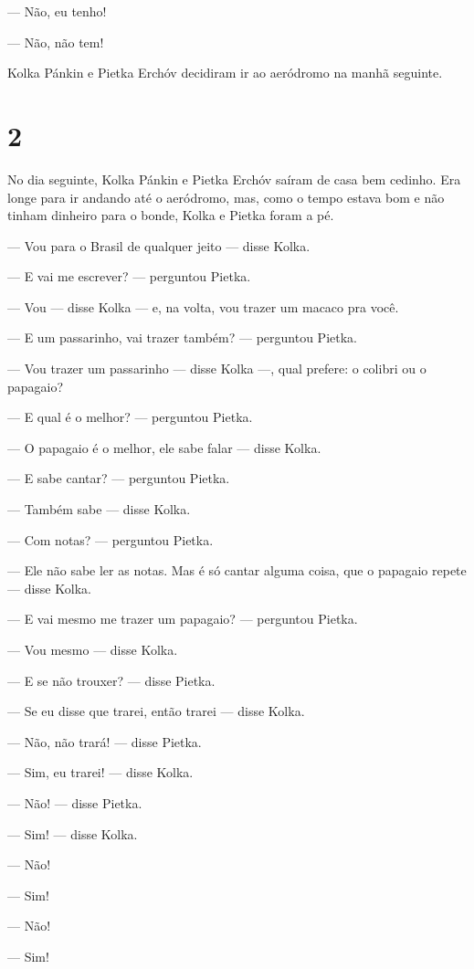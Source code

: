 --- Não, eu tenho!

--- Não, não tem!

Kolka Pánkin e Pietka Erchóv decidiram ir ao aeródromo na manhã
seguinte.

\section{2}

No dia seguinte, Kolka Pánkin e Pietka Erchóv saíram de casa bem
cedinho. Era longe para ir andando até o aeródromo, mas, como o tempo
estava bom e não tinham dinheiro para o bonde, Kolka e Pietka foram a
pé.

--- Vou para o Brasil de qualquer jeito --- disse Kolka.

--- E vai me escrever? --- perguntou Pietka.

--- Vou --- disse Kolka --- e, na volta, vou trazer um macaco pra você.

--- E um passarinho, vai trazer também? --- perguntou Pietka.

--- Vou trazer um passarinho --- disse Kolka ---, qual prefere: o
colibri ou o papagaio?

--- E qual é o melhor? --- perguntou Pietka.

--- O papagaio é o melhor, ele sabe falar --- disse Kolka.

--- E sabe cantar? --- perguntou Pietka.

--- Também sabe --- disse Kolka.

--- Com notas? --- perguntou Pietka.

--- Ele não sabe ler as notas. Mas é só cantar alguma coisa, que o
papagaio repete --- disse Kolka.

--- E vai mesmo me trazer um papagaio? --- perguntou Pietka.

--- Vou mesmo --- disse Kolka.

--- E se não trouxer? --- disse Pietka.

--- Se eu disse que trarei, então trarei --- disse Kolka.

--- Não, não trará! --- disse Pietka.

--- Sim, eu trarei! --- disse Kolka.

--- Não! --- disse Pietka.

--- Sim! --- disse Kolka.

--- Não!

--- Sim!

--- Não!

--- Sim!

